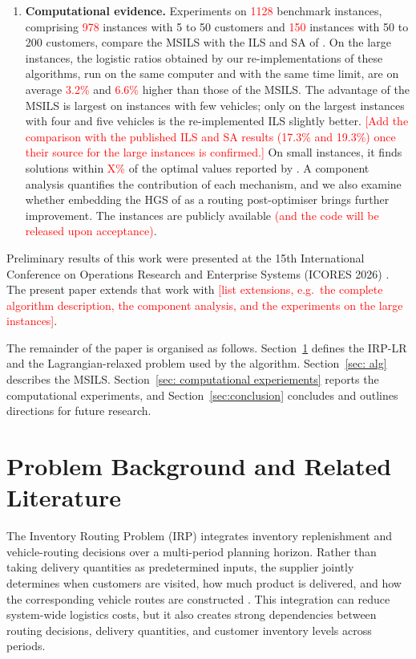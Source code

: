 \documentclass{article}
\begin{document}
\begin{enumerate}
  \item \textbf{Computational evidence.} Experiments on
  \textcolor{red}{1128} benchmark instances, comprising \textcolor{red}{978}
  instances with 5 to 50 customers and \textcolor{red}{150} instances with
  50 to 200 customers, compare the MSILS with the ILS and SA of
  \citet{alvarez2018iterated}. On the large instances, the logistic ratios
  obtained by our re-implementations of these algorithms, run on the same
  computer and with the same time limit, are on average
  \textcolor{red}{3.2\%} and \textcolor{red}{6.6\%} higher than those of the
  MSILS. The advantage of the MSILS is largest on instances with few
  vehicles; only on the largest instances with four and five vehicles is the
  re-implemented ILS slightly better. \textcolor{red}{[Add the comparison
  with the published ILS and SA results (17.3\% and 19.3\%) once their source
  for the large instances is confirmed.]} On small instances, it finds solutions
  within \textcolor{red}{X\%} of the optimal values reported by
  \citet{archetti2019exact}. A component analysis quantifies the
  contribution of each mechanism, and we also examine whether embedding the
  HGS of \citet{vidal2022hybrid} as a routing post-optimiser brings further
  improvement. The instances are publicly available
  \textcolor{red}{(and the code will be released upon acceptance)}.
\end{enumerate}

Preliminary results of this work were presented at the 15th International
Conference on Operations Research and Enterprise Systems (ICORES 2026)
\citep{archetti2026heuristic}. The present paper extends that work with
\textcolor{red}{[list extensions, e.g.\ the complete algorithm description,
the component analysis, and the experiments on the large instances]}.

The remainder of the paper is organised as follows.
Section~\ref{sec:problem_description} defines the IRP-LR and the
Lagrangian-relaxed problem used by the algorithm. Section~\ref{sec: alg}
describes the MSILS. Section~\ref{sec: computational experiements} reports
the computational experiments, and Section~\ref{sec:conclusion}
concludes and outlines directions for future research.

\section{Problem Background and Related Literature}
\label{sec:problem_description}

The Inventory Routing Problem (IRP) integrates inventory replenishment and
vehicle-routing decisions over a multi-period planning horizon. Rather than
taking delivery quantities as predetermined inputs, the supplier jointly
determines when customers are visited, how much product is delivered, and how
the corresponding vehicle routes are constructed
\citep{bertazzi2012inventory,coelho2014thirty}. This integration can reduce
system-wide logistics costs, but it also creates strong dependencies between
routing decisions, delivery quantities, and customer inventory levels across
periods.
\end{document}
